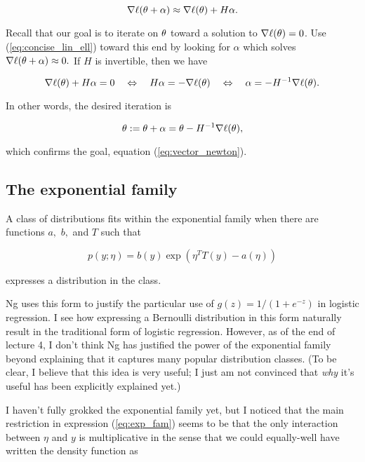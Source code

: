 \documentclass[]{article}
\begin{document}
\begin{equation}\nabla\ell(\theta + \alpha) \approx \nabla\ell(\theta) + H\alpha.\label{eq:concise_lin_ell}\end{equation}

Recall that our goal is to iterate on \(\theta\) toward a solution to
\(\nabla\ell(\theta)=0\). Use (\ref{eq:concise_lin_ell}) toward this end by
looking for \(\alpha\) which solves
\(\nabla\ell(\theta + \alpha) \approx 0.\) If \(H\) is invertible, then we
have

\newcommand{\lrarr}{\quad\Leftrightarrow\quad}

\[\nabla\ell(\th) + H\alpha = 0
\lrarr H\alpha = -\nabla\ell(\th)
\lrarr \alpha = -H^{-1}\nabla\ell(\th).\]

In other words, the desired iteration is

\[\theta := \theta + \alpha = \theta - H^{-1}\nabla\ell(\theta),\]

which confirms the goal, equation (\ref{eq:vector_newton}).

\subsection{The exponential family}\label{the-exponential-family}

A class of distributions fits within the exponential family when there
are functions \(a,\) \(b,\) and \(T\) such that

\begin{equation}p(y;\eta) = b(y)\exp(\eta^TT(y)-a(\eta))\label{eq:exp_fam}\end{equation}

expresses a distribution in the class.

Ng uses this form to justify the particular use of
\(g(z) = 1/(1+e^{-z})\) in logistic regression. I see how expressing a
Bernoulli distribution in this form naturally result in the traditional
form of logistic regression. However, as of the end of lecture 4, I
don't think Ng has justified the power of the exponential family beyond
explaining that it captures many popular distribution classes. (To be
clear, I believe that this idea is very useful; I just am not convinced
that \emph{why} it's useful has been explicitly explained yet.)

I haven't fully grokked the exponential family yet, but I noticed that
the main restriction in expression (\ref{eq:exp_fam}) seems to be that
the only interaction between \(\eta\) and \(y\) is multiplicative in the
sense that we could equally-well have written the density function as
\end{document}

